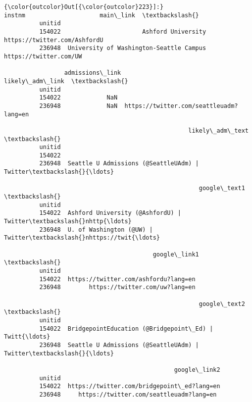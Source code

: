 \documentclass[11pt]{article}
\begin{document}
\begin{Verbatim}[commandchars=\\\{\}]
{\color{outcolor}Out[{\color{outcolor}223}]:}                                          instnm                     main\_link  \textbackslash{}
          unitid                                                                          
          154022                       Ashford University  https://twitter.com/AshfordU   
          236948  University of Washington-Seattle Campus        https://twitter.com/UW   
          
                 admissions\_link                          likely\_adm\_link  \textbackslash{}
          unitid                                                            
          154022             NaN                                            
          236948             NaN  https://twitter.com/seattleuadm?lang=en   
          
                                                    likely\_adm\_text  \textbackslash{}
          unitid                                                      
          154022                                                      
          236948  Seattle U Admissions (@SeattleUAdm) | Twitter\textbackslash{}{\ldots}   
          
                                                       google\_text1  \textbackslash{}
          unitid                                                      
          154022  Ashford University (@AshfordU) | Twitter\textbackslash{}nhttp{\ldots}   
          236948  U. of Washington (@UW) | Twitter\textbackslash{}nhttps://twit{\ldots}   
          
                                          google\_link1  \textbackslash{}
          unitid                                         
          154022  https://twitter.com/ashfordu?lang=en   
          236948        https://twitter.com/uw?lang=en   
          
                                                       google\_text2  \textbackslash{}
          unitid                                                      
          154022  BridgepointEducation (@Bridgepoint\_Ed) | Twitt{\ldots}   
          236948  Seattle U Admissions (@SeattleUAdm) | Twitter\textbackslash{}{\ldots}   
          
                                                google\_link2  
          unitid                                              
          154022  https://twitter.com/bridgepoint\_ed?lang=en  
          236948     https://twitter.com/seattleuadm?lang=en  
\end{Verbatim}
            
\end{document}

